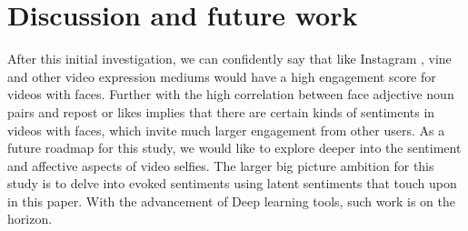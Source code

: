 \section{Discussion and future work}
After this initial investigation, we can confidently say that like Instagram \cite{Bakhshi:2014:FEU:2611105.2557403}, vine and other video expression mediums would have a high engagement score for videos with faces. Further with the high correlation between face adjective noun pairs and repost or likes implies that there are certain kinds of sentiments in videos with faces, which invite much larger engagement from other users.
As a future roadmap for this study, we would like to explore deeper into the sentiment and affective aspects of video selfies. The larger big picture ambition for this study is to delve into evoked sentiments using latent sentiments that touch upon in this paper. With the advancement of Deep learning tools, such work is on the horizon.